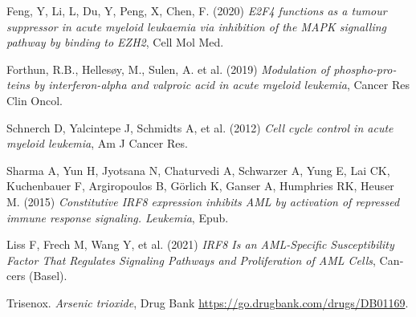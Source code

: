 \documentclass{article}
\begin{document}
\begin{thebibliography}{99}
	\begin{latin}		
		Feng, Y, Li, L, Du, Y, Peng, X, Chen, F. (2020) \emph{E2F4 functions as a tumour suppressor in acute myeloid leukaemia via inhibition of the MAPK signalling pathway by binding to EZH2}, Cell Mol Med.
		
		Forthun, R.B., Hellesøy, M., Sulen, A. et al. (2019) \emph{Modulation of phospho-proteins by interferon-alpha and valproic acid in acute myeloid leukemia}, Cancer Res Clin Oncol.
		
		Schnerch D, Yalcintepe J, Schmidts A, et al. (2012) \emph{Cell cycle control in acute myeloid leukemia}, Am J Cancer Res.
		
		Sharma A, Yun H, Jyotsana N, Chaturvedi A, Schwarzer A, Yung E, Lai CK, Kuchenbauer F, Argiropoulos B, Görlich K, Ganser A, Humphries RK, Heuser M. (2015) \emph{Constitutive IRF8 expression inhibits AML by activation of repressed immune response signaling. Leukemia}, Epub.
		
		Liss F, Frech M, Wang Y, et al. (2021) \emph{IRF8 Is an AML-Specific Susceptibility Factor That Regulates Signaling Pathways and Proliferation of AML Cells}, Cancers (Basel).
		
		Trisenox. \emph{Arsenic trioxide}, Drug Bank \url{https://go.drugbank.com/drugs/DB01169}.
		
		
		
	\end{latin}
\end{thebibliography}
\end{document}
